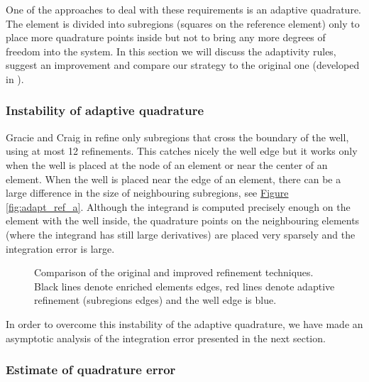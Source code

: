 \documentclass[dvipsnames,FM,Dis]{tulthesis}
\newcommand{\fig}[1]{\hyperref[#1]{Figure \ref{#1}}}
\newcommand{\figpath}{figures/}
\begin{document}
One of the approaches to deal with these requirements is an adaptive quadrature. The element is divided into 
subregions (squares on the reference element) only to place more quadrature points inside but not to bring 
any more degrees of freedom into the system. In this section we will discuss the adaptivity rules, 
suggest an improvement and compare our strategy to the original one (developed in \cite{gracie_modelling_2010}).

\subsubsection{Instability of adaptive quadrature}
\label{sec:refinement_element}
Gracie and Craig in \cite{gracie_modelling_2010} refine only subregions that cross the boundary of the well, using at most 12 refinements.
This catches nicely the well edge but it works only when the well is placed at the node of an element or near the center of an element. 
When the well is placed near the edge of an element, there can be
a large difference in the size of neighbouring subregions, see \fig{fig:adapt_ref_a}. Although
the integrand is computed precisely enough on the element with the well inside, the quadrature points on the
neighbouring elements (where the integrand has still large derivatives) are placed very sparsely 
and the integration error is large.

\begin{figure}[!htb]
  \centering    
  \hspace{0pt}
  \caption[Adaptive refinement comparison]
  {Comparison of the original and improved refinement techniques.
   Black lines denote enriched elements edges, red lines denote adaptive refinement (subregions edges) and the well
   edge is blue.
  }
  \label{fig:adapt_refinement}
\end{figure}
In order to overcome this instability of the adaptive quadrature, we have made an asymptotic analysis of the integration error presented 
in the next section.

\subsubsection{Estimate of quadrature error}
\end{document}
